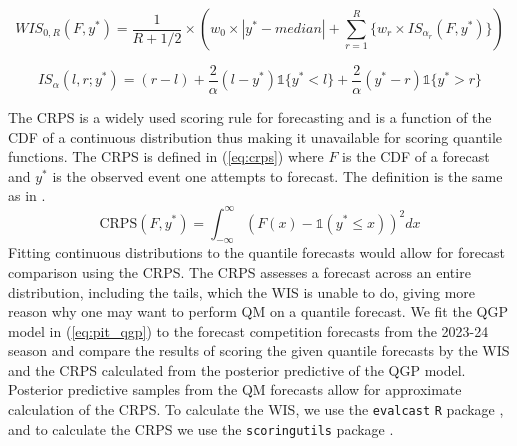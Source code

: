 \documentclass[preprint,12pt,authoryear]{elsarticle}
\newcommand{\1}[1]{\mathds{1}\left[#1\right]}
\begin{document}
\begin{equation}
\label{eq:wis}
        WIS_{0,R}(F, y^*) = \frac{1}{R + 1/2} \times 
        (w_0\times |y^* - median| + 
        \sum_{r=1}^R \{w_r \times IS_{\alpha_r}(F, y^*) \} )
\end{equation}

\begin{equation}
\label{eq:is}
        IS_{\alpha}(l,r;y^*) = (r-l) + 
        \frac{2}{\alpha}(l - y^*)\mathds{1}\{y^* < l\} + 
        \frac{2}{\alpha}(y^* - r) \mathds{1}\{y^* > r\}
\end{equation}

The CRPS is a widely used scoring rule for forecasting and is a function of the 
CDF of a continuous distribution thus making it unavailable for scoring 
quantile functions. The CRPS is defined in (\ref{eq:crps}) where $F$ is the 
CDF of a forecast and $y^*$ is the observed event one attempts to forecast. 
The definition is the same as in \cite{gneiting2014probabilistic}. 
\begin{equation}
    \label{eq:crps}
    \text{CRPS}(F, y^*) = \int_{-\infty}^{\infty} 
    (F(x) - \mathds{1} (y^* \leq x))^2 dx
\end{equation}
Fitting continuous distributions to the quantile forecasts would allow for 
forecast comparison using the CRPS. The CRPS assesses a forecast across an 
entire distribution, including the tails, which the WIS is unable to do, 
giving more reason why one may want to perform QM on a quantile forecast. 
We fit the QGP model in (\ref{eq:pit_qgp}) to the forecast competition 
forecasts from the 2023-24 season and compare the results of scoring the given 
quantile forecasts by the WIS and the CRPS calculated from the posterior 
predictive of the QGP model. Posterior predictive samples from the QM 
forecasts allow for approximate calculation of the CRPS. 
To calculate the WIS, we use the \texttt{evalcast} \texttt{R} package 
\cite[]{mcdonald2023evalcast}, and to calculate the CRPS we use the 
\texttt{scoringutils} package \cite[]{jordan2019scoringutils}.
\end{document}
